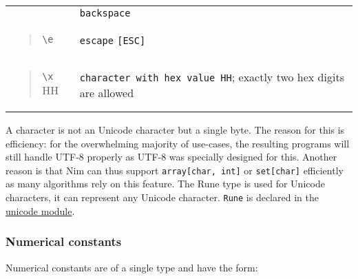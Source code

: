 \begin{longtable}[]{@{}ll@{}}
\begin{minipage}[t]{0.47\columnwidth}
\end{minipage} & \begin{minipage}[t]{0.47\columnwidth}\raggedright
\texttt{backspace}\strut
\end{minipage}\tabularnewline
\begin{minipage}[t]{0.47\columnwidth}\raggedright
\begin{quote}
\texttt{\textbackslash{}e}
\end{quote}\strut
\end{minipage} & \begin{minipage}[t]{0.47\columnwidth}\raggedright
\texttt{escape} \texttt{{[}ESC{]}}\strut
\end{minipage}\tabularnewline
\begin{minipage}[t]{0.47\columnwidth}\raggedright
\begin{quote}
\texttt{\textbackslash{}x} HH
\end{quote}\strut
\end{minipage} & \begin{minipage}[t]{0.47\columnwidth}\raggedright
\texttt{character\ with\ hex\ value\ HH}; exactly two hex digits are
allowed\strut
\end{minipage}\tabularnewline
\bottomrule
\end{longtable}

A character is not an Unicode character but a single byte. The reason
for this is efficiency: for the overwhelming majority of use-cases, the
resulting programs will still handle UTF-8 properly as UTF-8 was
specially designed for this. Another reason is that Nim can thus support
\texttt{array{[}char,\ int{]}} or \texttt{set{[}char{]}} efficiently as
many algorithms rely on this feature. The {Rune} type is used for
Unicode characters, it can represent any Unicode character.
\texttt{Rune} is declared in the \href{unicode.html}{unicode module}.

\hypertarget{numerical-constants}{%
\subsubsection{Numerical constants}\label{numerical-constants}}

Numerical constants are of a single type and have the form:


